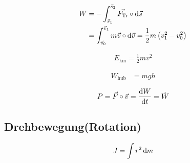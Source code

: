 \begin{boxleft}
\end{boxleft}\begin{boxrightshaded}
\begin{align}
W&=-\int_{\vec{s}_1}^{\vec{s}_2}\vec{F_{\text{Tr}}}\circ\mathop{}\!\mathrm{d} \vec{s}\\
&=\int_{\vec{v}_0}^{\vec{v}_1}m\vec{v}\circ\mathop{}\!\mathrm{d} \vec{v}=\frac{1}{2}m\left(v_1^2-v_0^2\right) 
\end{align}
\end{boxrightshaded}

\begin{boxleft}
\end{boxleft}\begin{boxrightshaded}
\begin{align}
E_{\text{kin}}=\frac{1}{2}mv^2
\end{align}
\end{boxrightshaded}


\begin{boxleft}
\end{boxleft}\begin{boxrightshaded}
\begin{align}
W_{\text{hub}}&=mgh
\end{align}
\end{boxrightshaded}

\begin{boxleft}
\end{boxleft}\begin{boxrightshaded}
\begin{align}
P=\vec{F}\circ\vec{v}=\frac{\mathop{}\!\mathrm{d} W}{\mathop{}\!\mathrm{d} t}=\dot{W}
\end{align}
\end{boxrightshaded}


\subsection{Drehbewegung(Rotation)}

\begin{boxleft}
\end{boxleft}\begin{boxrightshaded}
\begin{align}
J=\int r^2 \mathop{}\!\mathrm{d} m
\end{align}
\end{boxrightshaded}

